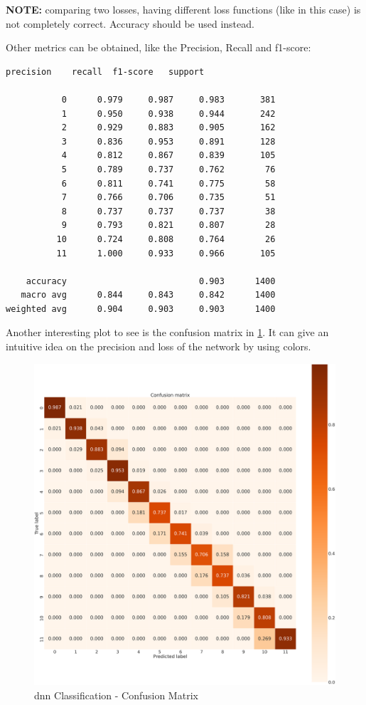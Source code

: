 \textbf{NOTE:} comparing two losses, having different loss functions (like in this case) is not completely correct. Accuracy should be used instead.

Other metrics can be obtained, like the Precision, Recall and f1-score:
\begin{lstlisting}[basicstyle=\ttfamily\footnotesize]
              precision    recall  f1-score   support
       
           0      0.979     0.987     0.983       381
           1      0.950     0.938     0.944       242
           2      0.929     0.883     0.905       162
           3      0.836     0.953     0.891       128
           4      0.812     0.867     0.839       105
           5      0.789     0.737     0.762        76
           6      0.811     0.741     0.775        58
           7      0.766     0.706     0.735        51
           8      0.737     0.737     0.737        38
           9      0.793     0.821     0.807        28
          10      0.724     0.808     0.764        26
          11      1.000     0.933     0.966       105

    accuracy                          0.903      1400
   macro avg      0.844     0.843     0.842      1400
weighted avg      0.904     0.903     0.903      1400
\end{lstlisting}
Another interesting plot to see is the confusion matrix in \cref{fig:confusion_matrix}. It can give an intuitive idea on the precision and loss of the network by using colors.
\begin{figure}[H]
    \centering
    \includegraphics[width=.6\linewidth]{sections/images/section3/confusion_matrix.png}
    \caption{\gls{dnn} Classification - Confusion Matrix}
    \label{fig:confusion_matrix}
\end{figure}
